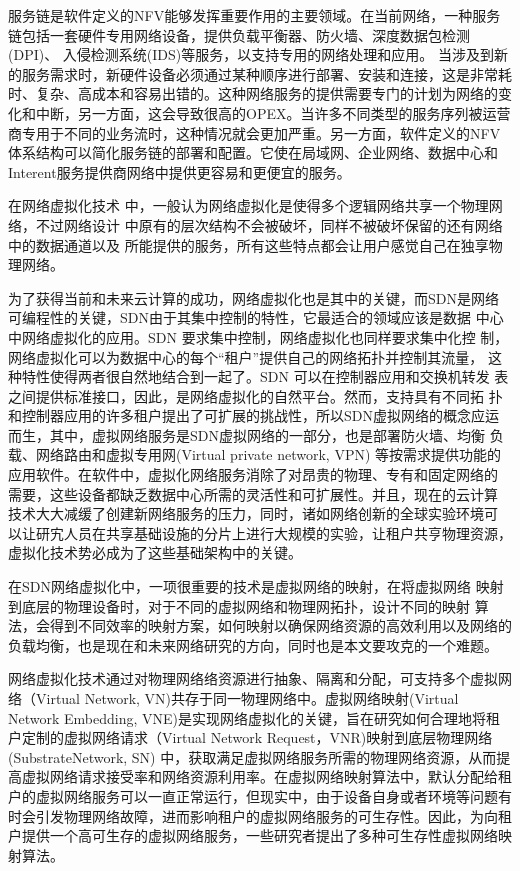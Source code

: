 服务链是软件定义的NFV能够发挥重要作用的主要领域\cite{friis2009service,lemmens2007enhancing}。在当前网络，一种服务链包括一套硬件专用网络设备，提供负载平衡器、防火墙、深度数据包检测(DPI)、 入侵检测系统(IDS)等服务，以支持专用的网络处理和应用\cite{greenberg2005clean,tschudin2001selnet,joseph2008policy,santos2008bridging}。 当涉及到新的服务需求时，新硬件设备必须通过某种顺序进行部署、安装和连接，这是非常耗时、复杂、高成本和容易出错的。这种网络服务的提供需要专门的计划为网络的变化和中断，另一方面，这会导致很高的OPEX。当许多不同类型的服务序列被运营商专用于不同的业务流时，这种情况就会更加严重。另一方面，软件定义的NFV 体系结构可以简化服务链的部署和配置。它使在局域网、企业网络、数据中心和Interent服务提供商网络中提供更容易和更便宜的服务。


在网络虚拟化技术 中，一般认为网络虚拟化是使得多个逻辑网络共享一个物理网络，不过网络设计 中原有的层次结构不会被破坏，同样不被破坏保留的还有网络中的数据通道以及 所能提供的服务，所有这些特点都会让用户感觉自己在独享物理网络。

为了获得当前和未来云计算的成功，网络虚拟化也是其中的关键，而SDN是网络可编程性的关键，SDN由于其集中控制的特性，它最适合的领域应该是数据 中心中网络虚拟化的应用。SDN 要求集中控制，网络虚拟化也同样要求集中化控 制，网络虚拟化可以为数据中心的每个“租户”提供自己的网络拓扑并控制其流量， 这种特性使得两者很自然地结合到一起了。SDN 可以在控制器应用和交换机转发 表之间提供标准接口，因此，是网络虚拟化的自然平台。然而，支持具有不同拓 扑和控制器应用的许多租户提出了可扩展的挑战性，所以SDN虚拟网络的概念应运而生，其中，虚拟网络服务是SDN虚拟网络的一部分，也是部署防火墙、均衡 负载、网络路由和虚拟专用网(Virtual private network, VPN) 等按需求提供功能的 应用软件。在软件中，虚拟化网络服务消除了对昂贵的物理、专有和固定网络的 需要，这些设备都缺乏数据中心所需的灵活性和可扩展性。并且，现在的云计算 技术大大减缓了创建新网络服务的压力，同时，诸如网络创新的全球实验环境可 以让研宄人员在共享基础设施的分片上进行大规模的实验，让租户共亨物理资源， 虚拟化技术势必成为了这些基础架构中的关键。

在SDN网络虚拟化中，一项很重要的技术是虚拟网络的映射，在将虚拟网络 映射到底层的物理设备时，对于不同的虚拟网络和物理网拓扑，设计不同的映射 算法，会得到不同效率的映射方案，如何映射以确保网络资源的高效利用以及网络的负载均衡，也是现在和未来网络研究的方向，同时也是本文要攻克的一个难题。

网络虚拟化\cite{chowdhury2009network}技术通过对物理网络络资源进行抽象、隔离和分配，可支持多个虚拟网络（Virtual Network, VN)共存于同一物理网络中。虚拟网络映射\cite{fischer2013virtual}(Virtual Network Embedding, VNE)是实现网络虚拟化的关键，旨在研究如何合理地将租户定制的虚拟网络请求（Virtual Network Request，VNR)映射到底层物理网络 (SubstrateNetwork, SN) 中，获取满足虚拟网络服务所需的物理网络资源，从而提高虚拟网络请求接受率和网络资源利用率。在虚拟网络映射算法\cite{6,8}中，默认分配给租户的虚拟网络服务可以一直正常运行，但现实中，由于设备自身或者环境等问题有时会引发物理网络故障，进而影响租户的虚拟网络服务的可生存性。因此，为向租户提供一个高可生存的虚拟网络服务，一些研究者提出了多种可生存性虚拟网络映射算法\cite{herker2013survey}。

